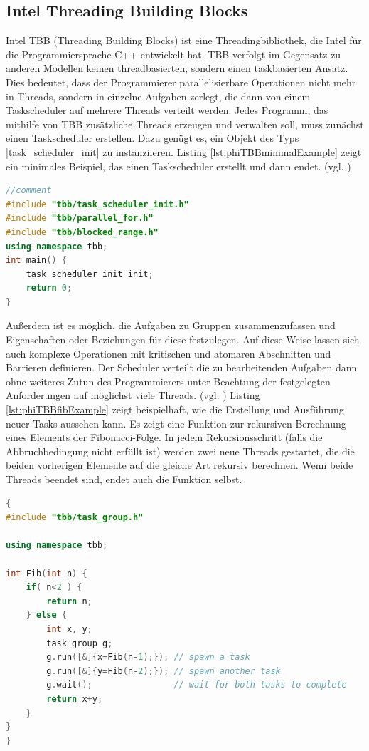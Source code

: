 \documentclass[../main.tex]{subfiles}
\begin{document}
\subsection{Intel Threading Building Blocks}
Intel TBB (Threading Building Blocks) ist eine Threadingbibliothek, die Intel für die Programmiersprache C++ entwickelt hat. TBB verfolgt im Gegensatz zu anderen Modellen keinen threadbasierten, sondern einen taskbasierten Ansatz. Dies bedeutet, dass der Programmierer parallelisierbare Operationen nicht mehr in Threads, sondern in einzelne Aufgaben zerlegt, die dann von einem Taskscheduler auf mehrere Threads verteilt werden. Jedes Programm, das mithilfe von TBB zusätzliche Threads erzeugen und verwalten soll, muss zunächst einen Taskscheduler erstellen. Dazu genügt es, ein Objekt des Typs |task_scheduler_init| zu instanziieren. Listing \ref{lst:phiTBBminimalExample} zeigt ein minimales Beispiel, das einen Taskscheduler erstellt und dann endet. (vgl. \cite{intelTBBtutorial})
\begin{lstlisting}[language=c++, caption={Minimalbeispiel zur Verwendung von Intel TBB(Quelle: \parencite{xeonphiBestPractices})}, captionpos=b, label=lst:phiTBBminimalExample, frame=single, linewidth=\textwidth, breaklines=true]
//comment
#include "tbb/task_scheduler_init.h"
#include "tbb/parallel_for.h"
#include "tbb/blocked_range.h"
using namespace tbb;
int main() {
	task_scheduler_init init;
	return 0;
}
\end{lstlisting}
Außerdem ist es möglich, die Aufgaben zu Gruppen zusammenzufassen und Eigenschaften oder Beziehungen für diese festzulegen. Auf diese Weise lassen sich auch komplexe Operationen mit kritischen und atomaren Abschnitten und Barrieren definieren. Der Scheduler verteilt die zu bearbeitenden Aufgaben dann ohne weiteres Zutun des Programmierers unter Beachtung der festgelegten Anforderungen auf möglichst viele Threads. (vgl. \cite{intelTBBtutorial}) Listing \ref{lst:phiTBBfibExample} zeigt beispielhaft, wie die Erstellung und Ausführung neuer Tasks aussehen kann. Es zeigt eine Funktion zur rekursiven Berechnung eines Elements der Fibonacci-Folge. In jedem Rekursionsschritt (falls die Abbruchbedingung nicht erfüllt ist) werden zwei neue Threads gestartet, die die beiden vorherigen Elemente auf die gleiche Art rekursiv berechnen. Wenn beide Threads beendet sind, endet auch die Funktion selbst. 
\begin{lstlisting}[language=c++, caption={Rekursive Funktion mit TBB zur Threadverwaltung(Quelle: \parencite{intelTBBtutorial})}, captionpos=b, label=lst:phiTBBfibExample, frame=single, linewidth=\textwidth, breaklines=true]
{
#include "tbb/task_group.h"

using namespace tbb;

int Fib(int n) {
	if( n<2 ) {
		return n;
	} else {
		int x, y;
		task_group g;
		g.run([&]{x=Fib(n-1);}); // spawn a task
		g.run([&]{y=Fib(n-2);}); // spawn another task
		g.wait();                // wait for both tasks to complete
		return x+y;
	}
}
}
\end{lstlisting}
\end{document}
